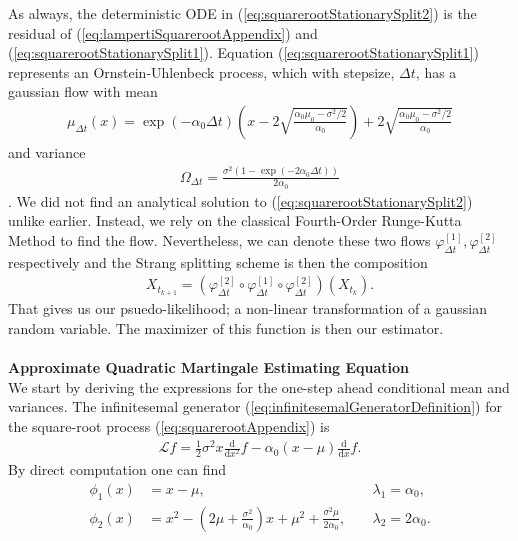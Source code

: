 As always, the deterministic ODE in (\ref{eq:squarerootStationarySplit2}) is the residual of (\ref{eq:lampertiSquarerootAppendix}) and (\ref{eq:squarerootStationarySplit1}).
Equation (\ref{eq:squarerootStationarySplit1}) represents an Ornstein-Uhlenbeck process, which with stepsize, $\Delta t$, has a gaussian flow with mean 
\begin{align}
    \mu_{\Delta t}(x) = \exp\left(-\alpha_0 \Delta t\right) \left(x - 2\sqrt{\frac{\alpha_0\mu_0 - \sigma^2 / 2}{\alpha_0}}\right) + 2\sqrt{\frac{\alpha_0\mu_0 - \sigma^2 / 2}{\alpha_0}}
\end{align}
and variance
\begin{align}
     \Omega_{\Delta t} = \frac{\sigma^2\left(1 - \exp\left(-2\alpha_0 \Delta t\right)\right)}{2\alpha_0}
\end{align}
\cite[(5), (6)]{SplittingSchemes}. We did not find an analytical solution to (\ref{eq:squarerootStationarySplit2}) unlike earlier. Instead, we rely  on the classical Fourth-Order Runge-Kutta Method \cite[p. 541]{numericalAnalysis} to find the flow. Nevertheless, we can denote these two flows $\varphi_{\Delta t}^{[1]}, \varphi_{\Delta t}^{[2]}$ respectively and the Strang splitting scheme is then the composition
\begin{align}
    X_{t_{k + 1}} = \left(\varphi_{\Delta t}^{[2]} \circ \varphi_{\Delta t}^{[1]} \circ \varphi_{\Delta t}^{[2]}\right)\left(X_{t_k}\right).
\end{align}
That gives us our psuedo-likelihood; a non-linear transformation of a gaussian random variable. The maximizer of this function is then our estimator. \\\\
\noindent \textbf{Approximate Quadratic Martingale Estimating Equation}\\
We start by deriving the expressions for the one-step ahead conditional mean and variances. The infinitesemal generator (\ref{eq:infinitesemalGeneratorDefinition}) for the square-root process (\ref{eq:squarerootAppendix}) is 
\begin{align}
    \mathcal{L}f = \frac{1}{2}\sigma^2x\frac{\mathrm{d}}{\mathrm{d}x^2}f -\alpha_0\left(x - \mu\right)\frac{\mathrm{d}}{\mathrm{d}x}f. \label{eq:infinitesemalGeneratorSquareRootProcess}
\end{align}
By direct computation one can find 
\begin{align}
    \phi_1(x) &= x-\mu, &&\; \lambda_1 = \alpha_0, \label{squarerooteigen1}\\
    \phi_2(x) &= x^2 - \left(2\mu + \frac{\sigma^2}{\alpha_0}\right)x + \mu^2 + \frac{\sigma^2\mu}{2\alpha_0}, &&\; \lambda_2 = 2\alpha_0. \label{squarerooteigen2}
\end{align}
